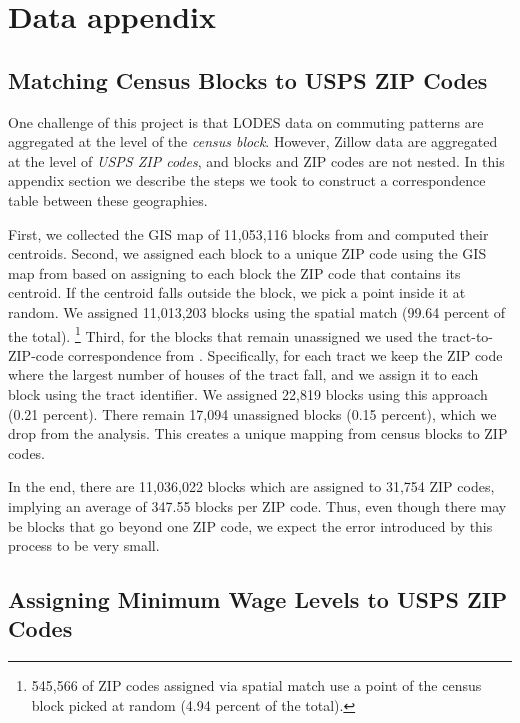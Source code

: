 \section{Data appendix}

\subsection{Matching Census Blocks to USPS ZIP Codes}
\label{sec:blocks_to_uspszip}

One challenge of this project is that LODES data on commuting patterns are 
aggregated at the level of the \textit{census block}.
However, Zillow data are aggregated at the level of \textit{USPS ZIP codes},
and blocks and ZIP codes are not nested.
In this appendix section we describe the steps we took to construct a 
correspondence table between these geographies.

First, we collected the GIS map of 11,053,116 blocks from \textcite{cbTiger} and
computed their centroids.
Second, we assigned each block to a unique ZIP code using the GIS map from 
\textcite{ESRI} based on assigning to each block the ZIP code that contains its 
centroid.
If the centroid falls outside the block, we pick a point inside it at random.
We assigned 11,013,203 blocks using the spatial match (99.64 percent of the 
total).%
\footnote{545,566 of ZIP codes assigned via spatial match use 
a point of the census block picked at random (4.94 percent of the total).}
Third, for the blocks that remain unassigned we used the tract-to-ZIP-code 
correspondence from \textcite{hudCrosswalks}.
Specifically, for each tract we keep the ZIP code where the largest number 
of houses of the tract fall, and we assign it to each block using the tract 
identifier.
We assigned 22,819 blocks using this approach (0.21 percent).
There remain 17,094 unassigned blocks (0.15 percent), which we drop from the 
analysis.
This creates a unique mapping from census blocks to ZIP codes.

In the end, there are 11,036,022 blocks which are assigned to 31,754 ZIP codes, 
implying an average of 347.55 blocks per ZIP code.
Thus, even though there may be blocks that go beyond one ZIP code, we expect 
the error introduced by this process to be very small.

\subsection{Assigning Minimum Wage Levels to USPS ZIP Codes}
\label{sec:assigning_mw_levels}

